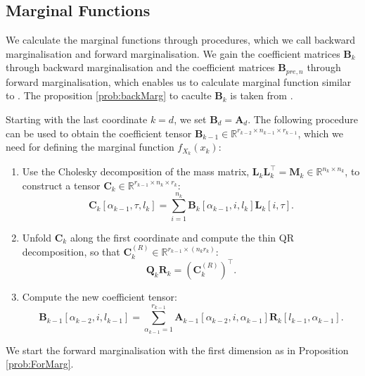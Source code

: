\subsection{Marginal Functions}
We calculate the marginal functions through procedures, which we call backward marginalisation \cite{cui2022deep} and forward marginalisation.
We gain the coefficient matrices $\bm{B}_k$ through backward marginalisation and the coefficient matrices $\bm{B}_{pre,n}$ through forward marginalisation, which enables us to calculate marginal function similar to \cite{cui2022deep}.
The proposition \ref{prob:backMarg} to caculte $\bm{B}_k$  is taken from \cite{cui2022deep}.
\begin{prop}
	\label{prob:backMarg}
	Starting with the last coordinate $k = d$, we set $\bm{B}_d = \bm{A}_d$. The following procedure can be used to obtain the coefficient tensor $\bm{B}_{k-1} \in \mathbb{R}^{r_{k-2} \times n_{k-1} \times r_{k-1}}$, which we need for defining the marginal function $f_{X_k}(x_k)$:
	\begin{enumerate}
		\item Use the Cholesky decomposition of the mass matrix, $\bm{L}_k \bm{L}_k^\top = \bm{M}_k \in \mathbb{R}^{n_k \times n_k}$, to construct a tensor $\bm{C}_k \in \mathbb{R}^{r_{k-1} \times n_k \times r_k}$:
		\begin{equation}
			\bm{C}_k[\alpha_{k-1}, \tau, l_k] = \sum_{i=1}^{n_k} \bm{B}_k[\alpha_{k-1}, i, l_k] \bm{L}_k[i, \tau].
		\end{equation}
		\item Unfold $\bm{C}_k$ along the first coordinate and compute the thin QR decomposition, so that $\bm{C}_k^{(R)} \in \mathbb{R}^{r_{k-1} \times (n_k r_k)}$:
		\begin{equation}
			\bm{Q}_k \bm{R}_k = {(\bm{C}_k^{(R)})}^{\top}.
		\end{equation}
		\item Compute the new coefficient tensor:
		\begin{equation}
			\bm{B}_{k-1}[\alpha_{k-2}, i, l_{k-1}] = \sum_{\alpha_{k-1}=1}^{r_{k-1}} \bm{A}_{k-1}[\alpha_{k-2}, i, \alpha_{k-1}] \bm{R}_k[l_{k-1}, \alpha_{k-1}].
		\end{equation}
	\end{enumerate}
\end{prop}
We start the forward marginalisation with the first dimension as in Proposition \ref{prob:ForMarg}.
